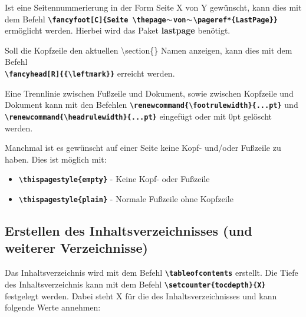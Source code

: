 Ist eine Seitennummerierung in der Form Seite X von Y gewünscht, kann dies mit dem Befehl \textbf{\texttt{\textbackslash fancyfoot[C]\{Seite \textbackslash thepage$\thicksim$von$\thicksim$\textbackslash pageref*\{LastPage\}\}}} ermöglicht werden. Hierbei wird das Paket \textbf{lastpage} benötigt.

Soll die Kopfzeile den aktuellen \textbackslash section\{\} Namen anzeigen, kann dies mit dem Befehl \\ \textbf{\texttt{\textbackslash fancyhead[R]\{\{\textbackslash leftmark\}\}}} erreicht werden.

Eine Trennlinie zwischen Fußzeile und Dokument, sowie zwischen Kopfzeile und Dokument kann mit den Befehlen \textbf{\texttt{\textbackslash renewcommand\{\textbackslash footrulewidth\}\{...pt\}}} und \textbf{\texttt{\textbackslash renewcommand\{\textbackslash headrulewidth\}\{...pt\}}} eingefügt oder mit 0pt gelöscht werden.

Manchmal ist es gewünscht auf einer Seite keine Kopf- und/oder Fußzeile zu haben. Dies ist möglich mit:
\begin{itemize}
  \item \textbf{\texttt{\textbackslash thispagestyle\{empty\}}} - Keine Kopf- oder Fußzeile
  \item \textbf{\texttt{\textbackslash thispagestyle\{plain\}}} - Normale Fußzeile ohne Kopfzeile
\end{itemize}

\newpage

\subsection{Erstellen des Inhaltsverzeichnisses (und weiterer Verzeichnisse)}
\label{sec:inhaltsverzeichnis}
Das Inhaltsverzeichnis wird mit dem Befehl \textbf{\texttt{\textbackslash tableofcontents}} erstellt. Die Tiefe des Inhaltsverzeichnis kann mit dem Befehl \textbf{\texttt{\textbackslash setcounter\{tocdepth\}\{X\}}} festgelegt werden. Dabei steht X für die  des Inhaltsverzeichnisses und kann folgende Werte annehmen:

